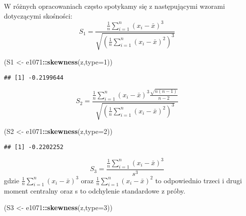 \documentclass[polish,]{book}
\newenvironment{Shaded}{\begin{snugshade}}{\end{snugshade}}
\newcommand{\DataTypeTok}[1]{\textcolor[rgb]{0.13,0.29,0.53}{#1}}
\newcommand{\DecValTok}[1]{\textcolor[rgb]{0.00,0.00,0.81}{#1}}
\newcommand{\KeywordTok}[1]{\textcolor[rgb]{0.13,0.29,0.53}{\textbf{#1}}}
\newcommand{\NormalTok}[1]{#1}
\newcommand{\OperatorTok}[1]{\textcolor[rgb]{0.81,0.36,0.00}{\textbf{#1}}}
\newcommand{\StringTok}[1]{\textcolor[rgb]{0.31,0.60,0.02}{#1}}
\begin{document}
W różnych opracowaniach często spotykamy się z następującymi wzorami dotyczącymi skośności:
\begin{equation}
S_{1}=\frac{\frac{1}{n}\sum_{i=1}^{n}(x_i-\bar{x})^3}{\sqrt{\left(\frac{1}{n}\sum_{i=1}^{n}(x_i-\bar{x})^2\right)^3}}
\label{eq:wz914}
\end{equation}

\begin{Shaded}
\begin{Highlighting}[]
\NormalTok{(S1 <-}\StringTok{ }\NormalTok{e1071}\OperatorTok{::}\KeywordTok{skewness}\NormalTok{(z,}\DataTypeTok{type=}\DecValTok{1}\NormalTok{))}
\end{Highlighting}
\end{Shaded}

\begin{verbatim}
## [1] -0.2199644
\end{verbatim}

\begin{equation}
S_{2}=\frac{\frac{1}{n}\sum_{i=1}^{n}(x_i-\bar{x})^3\frac{\sqrt{n(n-1)}}{n-2}}{\sqrt{\left(\frac{1}{n}\sum_{i=1}^{n}(x_i-\bar{x})^2\right)^3}}
\label{eq:wz915}
\end{equation}

\begin{Shaded}
\begin{Highlighting}[]
\NormalTok{(S2 <-}\StringTok{ }\NormalTok{e1071}\OperatorTok{::}\KeywordTok{skewness}\NormalTok{(z,}\DataTypeTok{type=}\DecValTok{2}\NormalTok{))}
\end{Highlighting}
\end{Shaded}

\begin{verbatim}
## [1] -0.2202252
\end{verbatim}

\begin{equation}
S_{3}=\frac{\frac{1}{n}\sum_{i=1}^{n}(x_i-\bar{x})^3}{s^3}
\label{eq:wz916}
\end{equation}
gdzie \(\frac{1}{n}\sum_{i=1}^{n}(x_i-\bar{x})^3\) oraz \(\frac{1}{n}\sum_{i=1}^{n}(x_i-\bar{x})^2\) to odpowiednio trzeci i drugi moment
centralny oraz s to odchylenie standardowe z próby.

\begin{Shaded}
\begin{Highlighting}[]
\NormalTok{(S3 <-}\StringTok{ }\NormalTok{e1071}\OperatorTok{::}\KeywordTok{skewness}\NormalTok{(z,}\DataTypeTok{type=}\DecValTok{3}\NormalTok{))}
\end{Highlighting}
\end{Shaded}
\end{document}
